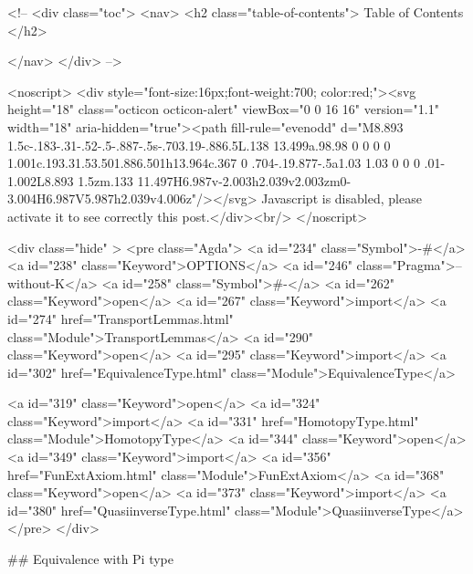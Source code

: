   <!-- 
  <div class="toc">
    <nav>
    <h2 class="table-of-contents"> Table of Contents </h2>
      

    </nav>
  </div>
   -->

  <noscript>
  <div style="font-size:16px;font-weight:700; color:red;"><svg height="18" class="octicon octicon-alert" viewBox="0 0 16 16" version="1.1" width="18" aria-hidden="true"><path fill-rule="evenodd" d="M8.893 1.5c-.183-.31-.52-.5-.887-.5s-.703.19-.886.5L.138 13.499a.98.98 0 0 0 0 1.001c.193.31.53.501.886.501h13.964c.367 0 .704-.19.877-.5a1.03 1.03 0 0 0 .01-1.002L8.893 1.5zm.133 11.497H6.987v-2.003h2.039v2.003zm0-3.004H6.987V5.987h2.039v4.006z"/></svg> Javascript is disabled, please activate it to see correctly this post.</div><br/>
  </noscript>

  <div class="hide" >
<pre class="Agda">
<a id="234" class="Symbol">{-#</a> <a id="238" class="Keyword">OPTIONS</a> <a id="246" class="Pragma">--without-K</a> <a id="258" class="Symbol">#-}</a>
<a id="262" class="Keyword">open</a> <a id="267" class="Keyword">import</a> <a id="274" href="TransportLemmas.html" class="Module">TransportLemmas</a>
<a id="290" class="Keyword">open</a> <a id="295" class="Keyword">import</a> <a id="302" href="EquivalenceType.html" class="Module">EquivalenceType</a>

<a id="319" class="Keyword">open</a> <a id="324" class="Keyword">import</a> <a id="331" href="HomotopyType.html" class="Module">HomotopyType</a>
<a id="344" class="Keyword">open</a> <a id="349" class="Keyword">import</a> <a id="356" href="FunExtAxiom.html" class="Module">FunExtAxiom</a>
<a id="368" class="Keyword">open</a> <a id="373" class="Keyword">import</a> <a id="380" href="QuasiinverseType.html" class="Module">QuasiinverseType</a>
</pre>
</div>


## Equivalence with Pi type

